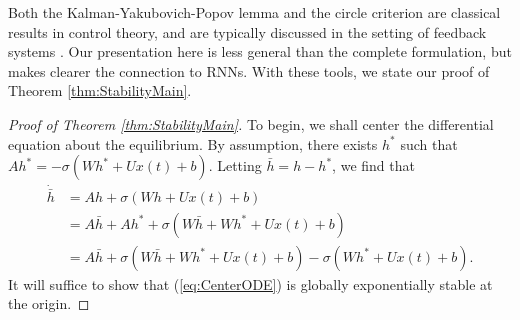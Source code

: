 \documentclass{article} \usepackage{iclr2021_conference,times}
\begin{document}
Both the Kalman-Yakubovich-Popov lemma and the circle criterion are classical results in control theory, and are typically discussed in the setting of feedback systems \cite[Chapter 6, 7]{khalil2002nonlinear}. Our presentation here is less general than the complete formulation, but makes clearer the connection to RNNs. With these tools, we state our proof of Theorem \ref{thm:StabilityMain}.

\begin{proof}[Proof of Theorem \ref{thm:StabilityMain}]
To begin, we shall center the differential equation about the equilibrium. By assumption, there exists $h^\ast$ such that $A h^\ast = -\sigma(W h^\ast + Ux(t) + b)$. Letting $\bar{h} = h - h^\ast$, we find that
\begin{align}
\dot{\bar{h}}&=Ah+\sigma(Wh+Ux(t)+b)\nonumber\\
&=A\bar{h}+Ah^{\ast}+\sigma(W\bar{h}+Wh^{\ast}+Ux(t)+b)\nonumber\\
&=A\bar{h}+\sigma(W\bar{h}+Wh^{\ast}+Ux(t)+b)-\sigma(Wh^{\ast}+Ux(t)+b).\label{eq:CenterODE}
\end{align}
It will suffice to show that (\ref{eq:CenterODE}) is globally exponentially stable at the origin.


\end{proof}
\end{document}
